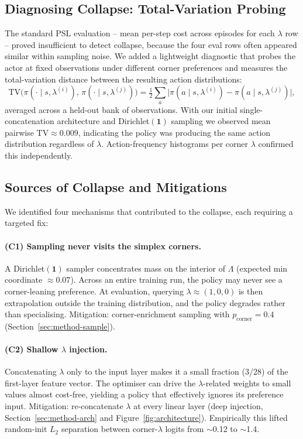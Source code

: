 \documentclass[12pt, letterpaper]{article}
\begin{document}
\subsection{Diagnosing Collapse: Total-Variation Probing}
The standard PSL evaluation -- mean per-step cost across episodes for each $\lambda$ row -- proved insufficient to detect collapse, because the four eval rows often appeared similar within sampling noise. We added a lightweight diagnostic that probes the actor at fixed observations under different corner preferences and measures the total-variation distance between the resulting action distributions:
\begin{equation}
    \mathrm{TV}\big(\pi(\cdot \mid s, \lambda^{(i)}),\,\pi(\cdot \mid s, \lambda^{(j)})\big) = \tfrac{1}{2} \!\sum_a \big| \pi(a \mid s, \lambda^{(i)}) - \pi(a \mid s, \lambda^{(j)}) \big|,
\end{equation}
averaged across a held-out bank of observations. With our initial single-concatenation architecture and Dirichlet$(\bm{1})$ sampling we observed mean pairwise $\mathrm{TV} \approx 0.009$, indicating the policy was producing the same action distribution regardless of $\lambda$. Action-frequency histograms per corner $\lambda$ confirmed this independently.

\subsection{Sources of Collapse and Mitigations}
We identified four mechanisms that contributed to the collapse, each requiring a targeted fix:

\paragraph{(C1) Sampling never visits the simplex corners.}
A Dirichlet$(\bm{1})$ sampler concentrates mass on the interior of $\Lambda$ (expected min coordinate $\approx 0.07$). Across an entire training run, the policy may never see a corner-leaning preference. At evaluation, querying $\lambda \approx (1, 0, 0)$ is then extrapolation outside the training distribution, and the policy degrades rather than specialising. Mitigation: corner-enrichment sampling with $p_{\text{corner}} = 0.4$ (Section~\ref{sec:method-sample}).

\paragraph{(C2) Shallow $\lambda$ injection.}
Concatenating $\lambda$ only to the input layer makes it a small fraction (3/28) of the first-layer feature vector. The optimiser can drive the $\lambda$-related weights to small values almost cost-free, yielding a policy that effectively ignores its preference input. Mitigation: re-concatenate $\lambda$ at every linear layer (deep injection, Section~\ref{sec:method-arch} and Figure~\ref{fig:architecture}). Empirically this lifted random-init $L_2$ separation between corner-$\lambda$ logits from $\sim$0.12 to $\sim$1.4.
\end{document}
